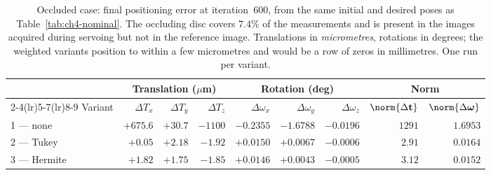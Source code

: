 \begin{table}[t]
    \centering
    \caption{Occluded case: final positioning error at iteration~600, from
    the same initial and desired poses as Table~\ref{tab:ch4-nominal}. The
    occluding disc covers $7.4\%$ of the measurements and is present in the
    images acquired during servoing but not in the reference image.
    Translations in \emph{micrometres}, rotations in degrees; the weighted
    variants position to within a few micrometres and would be a row of
    zeros in millimetres. One run per variant.}
    \label{tab:ch4-occluded}
    \small
    \begin{tabular}{@{}lrrrrrrrr@{}}
        \toprule
        & \multicolumn{3}{c}{Translation ($\mu$m)}
        & \multicolumn{3}{c}{Rotation (deg)}
        & \multicolumn{2}{c}{Norm} \\
        \cmidrule(lr){2-4}\cmidrule(lr){5-7}\cmidrule(lr){8-9}
        Variant & $\Delta T_x$ & $\Delta T_y$ & $\Delta T_z$
                & $\Delta\omega_x$ & $\Delta\omega_y$ & $\Delta\omega_z$
                & $\norm{\Delta\mathbf{t}}$ & $\norm{\Delta\boldsymbol{\omega}}$ \\
        \midrule
        1 --- none    & $+675.6$ & $+30.7$ & $-1100$ & $-0.2355$ & $-1.6788$ & $-0.0196$ & $1291$ & $1.6953$ \\
        2 --- Tukey   & $+0.05$  & $+2.18$ & $-1.92$ & $+0.0150$ & $+0.0067$ & $-0.0006$ & $2.91$ & $0.0164$ \\
        3 --- Hermite & $+1.82$  & $+1.75$ & $-1.85$ & $+0.0146$ & $+0.0043$ & $-0.0005$ & $3.12$ & $\mathbf{0.0152}$ \\
        \bottomrule
    \end{tabular}
\end{table}

